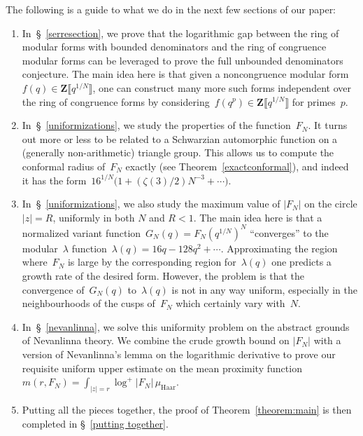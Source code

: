 \documentclass[10pt]{amsart}
\def\SSSS{\S}
\def\Z{\mathbf{Z}}
\theoremstyle{remark}
\numberwithin{equation}{subsection}
\begin{document}
The following is  a guide to what we do in the next few sections of our paper:
 \begin{enumerate}
 \item In~\SSSS~\ref{serresection}, we prove that the logarithmic gap between  the ring of modular forms
 with bounded denominators and the ring of congruence modular forms 
  can be leveraged
 to prove the full unbounded denominators conjecture. The main idea here is that given
 a noncongruence modular form~$f(q) \in \Z  \llbracket q^{1/N} \rrbracket$, one can construct
 many more 
 such forms independent over the ring of congruence forms by considering~$f(q^{p}) \in \Z\llbracket q^{1/N} \rrbracket$ for primes~$p$. 

 \item In~\SSSS~\ref{uniformizations}, we study the properties of the function~$F_N$.
 It turns out more or less to be related to a Schwarzian automorphic function on a
 (generally non-arithmetic) triangle group. This allows us to compute the conformal radius of~$F_N$
 exactly (see Theorem~\ref{exactconformal}), and indeed it has the form~$16^{1/N}\big(1 + (\zeta(3)/2) N^{-3}+ \cdots \big)$.

\item In~\SSSS~\ref{uniformizations}, we also study the maximum value of $|F_N|$ on the
circle $|z| = R$, uniformly in both $N$ and $R <  1$. The main idea here is that a normalized variant function~$G_N(q) = F_N(q^{1/N})^N$
``converges'' to the modular~$\lambda$ function~$\lambda(q) = 16 q - 128 q^2 + \cdots$.
Approximating the region where~$F_N$ is large by the corresponding region for~$\lambda(q)$
one predicts a growth rate of the desired form. However, the problem is that the convergence
of~$G_N(q)$ to~$\lambda(q)$ is not in any way uniform, especially in the neighbourhoods of the cusps
of~$F_N$ which certainly vary with~$N$. 



\item In~\SSSS~\ref{nevanlinna}, we  solve this uniformity problem on the abstract grounds of Nevanlinna theory. We
combine the crude growth bound on $|F_N|$ with a version of Nevanlinna's lemma on the logarithmic derivative to prove our requisite uniform upper estimate on the mean proximity function $m(r,  F_N) = \int_{|z| = r} \log^+{|F_N|} \, \mu_{\mathrm{Haar}}$. 


\item Putting all the pieces together, the proof of Theorem~\ref{theorem:main} is then completed in \SSSS~\ref{putting together}. 



\end{enumerate}
\end{document}
